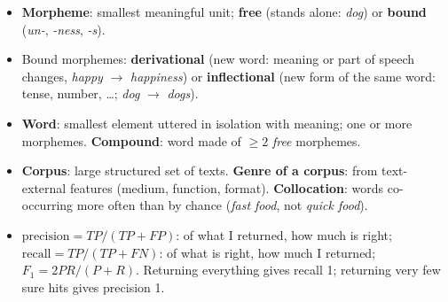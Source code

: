 \begin{nbsummary}[terminology]
\begin{itemize}[nosep]
  \item \textbf{Morpheme}: smallest meaningful unit; \textbf{free} (stands alone:
        \emph{dog}) or \textbf{bound} (\emph{un-}, \emph{-ness}, \emph{-s}).
  \item Bound morphemes: \textbf{derivational} (new word: meaning or part of speech
        changes, \emph{happy} $\to$ \emph{happiness}) or \textbf{inflectional} (new form
        of the same word: tense, number, \ldots; \emph{dog} $\to$ \emph{dogs}).
  \item \textbf{Word}: smallest element uttered in isolation with meaning; one or more
        morphemes. \textbf{Compound}: word made of $\geq 2$ \emph{free} morphemes.
  \item \textbf{Corpus}: large structured set of texts. \textbf{Genre of a corpus}: from
        text-external features (medium, function, format). \textbf{Collocation}: words
        co-occurring more often than by chance (\emph{fast food}, not \emph{quick food}).
  \item $\text{precision} = TP/(TP+FP)$: of what I returned, how much is right;
        $\text{recall} = TP/(TP+FN)$: of what is right, how much I returned;
        $F_1 = 2PR/(P+R)$. Returning everything gives recall 1; returning very few
        sure hits gives precision 1.
\end{itemize}
\end{nbsummary}
